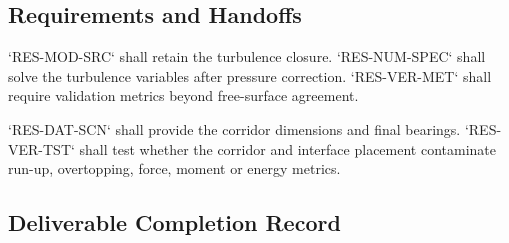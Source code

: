 \subsection{Requirements and Handoffs}
\label{sec:res-phy-scl-requirements}


`RES-MOD-SRC` shall retain the turbulence closure. `RES-NUM-SPEC`
shall solve the turbulence variables after pressure correction.
`RES-VER-MET` shall require validation metrics beyond free-surface
agreement.

`RES-DAT-SCN` shall provide the corridor dimensions and final bearings.
`RES-VER-TST` shall test whether the corridor and interface placement
contaminate run-up, overtopping, force, moment or energy metrics.

\subsection{Deliverable Completion Record}
\label{sec:res-phy-scl-completion-record}

%
%
%
